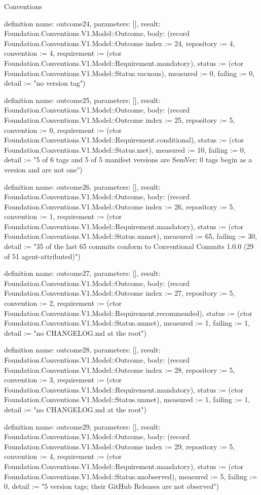 \begin{lexlean}{Conventions}
\begin{semanticmodule}
definition{
  name: outcome24,
  parameters: [],
  result: Foundation.Conventions.V1.Model::Outcome,
  body: (record Foundation.Conventions.V1.Model::Outcome {index := 24, repository := 4, convention := 4, requirement := (ctor Foundation.Conventions.V1.Model::Requirement.mandatory), status := (ctor Foundation.Conventions.V1.Model::Status.vacuous), measured := 0, failing := 0, detail := "no version tag"})
}

definition{
  name: outcome25,
  parameters: [],
  result: Foundation.Conventions.V1.Model::Outcome,
  body: (record Foundation.Conventions.V1.Model::Outcome {index := 25, repository := 5, convention := 0, requirement := (ctor Foundation.Conventions.V1.Model::Requirement.conditional), status := (ctor Foundation.Conventions.V1.Model::Status.met), measured := 10, failing := 0, detail := "5 of 6 tags and 5 of 5 manifest versions are SemVer; 0 tags begin as a version and are not one"})
}

definition{
  name: outcome26,
  parameters: [],
  result: Foundation.Conventions.V1.Model::Outcome,
  body: (record Foundation.Conventions.V1.Model::Outcome {index := 26, repository := 5, convention := 1, requirement := (ctor Foundation.Conventions.V1.Model::Requirement.mandatory), status := (ctor Foundation.Conventions.V1.Model::Status.unmet), measured := 65, failing := 30, detail := "35 of the last 65 commits conform to Conventional Commits 1.0.0 (29 of 51 agent-attributed)"})
}

definition{
  name: outcome27,
  parameters: [],
  result: Foundation.Conventions.V1.Model::Outcome,
  body: (record Foundation.Conventions.V1.Model::Outcome {index := 27, repository := 5, convention := 2, requirement := (ctor Foundation.Conventions.V1.Model::Requirement.recommended), status := (ctor Foundation.Conventions.V1.Model::Status.unmet), measured := 1, failing := 1, detail := "no CHANGELOG.md at the root"})
}

definition{
  name: outcome28,
  parameters: [],
  result: Foundation.Conventions.V1.Model::Outcome,
  body: (record Foundation.Conventions.V1.Model::Outcome {index := 28, repository := 5, convention := 3, requirement := (ctor Foundation.Conventions.V1.Model::Requirement.mandatory), status := (ctor Foundation.Conventions.V1.Model::Status.unmet), measured := 1, failing := 1, detail := "no CHANGELOG.md at the root"})
}

definition{
  name: outcome29,
  parameters: [],
  result: Foundation.Conventions.V1.Model::Outcome,
  body: (record Foundation.Conventions.V1.Model::Outcome {index := 29, repository := 5, convention := 4, requirement := (ctor Foundation.Conventions.V1.Model::Requirement.mandatory), status := (ctor Foundation.Conventions.V1.Model::Status.unobserved), measured := 5, failing := 0, detail := "5 version tags; their GitHub Releases are not observed"})
}


\end{semanticmodule}
\end{lexlean}
